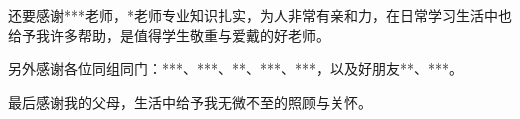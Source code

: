 \documentclass[promaster]{thesis-uestc}
\begin{document}
还要感谢***老师，*老师专业知识扎实，为人非常有亲和力，在日常学习生活中也给予我许多帮助，是值得学生敬重与爱戴的好老师。

另外感谢各位同组同门：***、***、**、***、***，以及好朋友**、***。

最后感谢我的父母，生活中给予我无微不至的照顾与关怀。


\nocite{*}

%
% 
%
% 
% 
%


\end{document}
